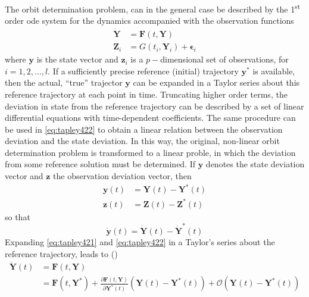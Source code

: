 The orbit determination problem, can in the general case be described by the 
1\textsuperscript{st} order \gls{ode} system for the dynamics accompanied with 
the observation functions
\begin{align}
  \bm{\dot{Y}} &= \bm{F}(t, \bm{Y}) \label{eq:tapley421} \\
  \bm{Z}_i     &=  G(t_i, \bm{Y}_i) + \bm{\epsilon}_i \label{eq:tapley422}
\end{align}
where $\bm{y}$ is the state vector and $\bm{z}_i$ is a $p-$dimensional set of 
observations, for $i=1,2,\dots ,l$. If a sufficiently precise reference (initial) 
trajectory $\bm{y}^{*}$ is available, then the actual, ``true'' trajector $\bm{y}$ 
can be expanded in a Taylor series about this reference trajectory at each point 
in time. Truncating higher order terms, the deviation in state from the 
reference trajectory can be described by a set of linear differential equations 
with time-dependent coefficients. The same procedure can be used in \autoref{eq:tapley422} 
to obtain a linear relation between the observation deviation and the state deviation.
In this way, the original, non-linear orbit determination problem is transformed 
to a linear proble, in which the deviation from some reference solution must be 
determined.
If $\bm{y}$ denotes the state deviation vector and $\bm{z}$ the observation deviation 
vector, then
\begin{equation}
  \begin{aligned}
    \bm{y}(t) &= \bm{Y}(t) - \bm{Y}^{*}(t) \\
    \bm{z}(t) &= \bm{Z}(t) - \bm{Z}^{*}(t)
  \end{aligned}
\end{equation}
so that
\begin{equation}\label{eq:tapley424}
  \dot{\bm{y}}(t) = \dot{\bm{Y}}(t) - \dot{\bm{Y}}^{*}(t)
\end{equation}
Expanding \autoref{eq:tapley421} and \autoref{eq:tapley422} in a Taylor's series 
about the reference trajectory, leads to (\cite{Tapley2004})
\begin{equation}\label{eq:tapley425a}
  \begin{aligned}
  \bm{\dot{Y}}(t) &= \bm{F}(t, \bm{Y}) \\
                  &= \bm{F}(t, \bm{Y}^{*}) + 
                  \frac{\partial \bm{F}(t, \bm{Y})}{\partial \bm{Y}^{*}(t)} 
                  \left( \bm{Y}(t) - \bm{Y}^{*}(t) \right) 
                  + \mathcal{O}\left( \bm{Y}(t) - \bm{Y}^{*}(t) \right)
  \end{aligned}
\end{equation}
